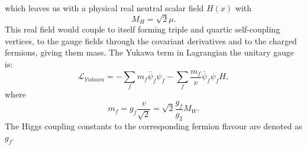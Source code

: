   which leaves us with a physical real neutral scalar field $H(x)$ with 
    \begin{equation}
	M_H=\sqrt{2}\mu.
  \end{equation}
 This real field would couple to itself forming triple and quartic self-coupling vertices, to the gauge fields through the covariant derivatives and to the charged fermions, giving them mass. The Yukawa term in Lagrangian the unitary gauge is:
     \begin{equation}
\mathcal{L}_{Yukawa}=-\sum_f m_f \bar\psi_f\psi_f-\sum_f \frac{m_f}{v} \bar\psi_f\psi_f H,
 \end{equation}
where
\begin{equation}
m_f=g_f\frac{v}{\sqrt{2}}=\sqrt{2}\frac{g_f}{g_2}M_W.
\end{equation}
The Higgs coupling constants to the corresponding fermion flavour are denoted as $g_f$. 
